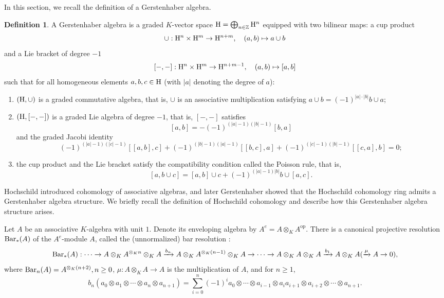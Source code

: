 \documentclass[10pt, reqno]{amsart}
\theoremstyle{definition}
\newtheorem{definition}[theorem]{Definition}
\theoremstyle{remark}
\numberwithin{equation}{section}
\begin{document}
In this section, we recall the definition of a Gerstenhaber algebra. 
\begin{definition}
    A Gerstenhaber algebra   is a graded \(K\)-vector space \(\mathrm{H} = \bigoplus_{n\in\mathbb{Z}} \mathrm{H}^n\) equipped with two bilinear maps: a cup product
\[\cup: \mathrm{H}^n \times \mathrm{H}^m \to \mathrm{H}^{n+m}, \quad (a, b) \mapsto a \cup b\]
and a Lie bracket of degree \(-1\)
\[[-,-]: \mathrm{H}^n \times \mathrm{H}^m \to \mathrm{H}^{n+m-1}, \quad (a, b) \mapsto [a, b]\]
such that for all homogeneous elements \(a, b, c \in \mathrm{H}\) (with \(|a|\) denoting the degree of \(a\)):
\begin{enumerate}
    \item \((\mathrm{H}, \cup)\) is a graded commutative algebra, that is, \(\cup\) is an associative multiplication satisfying \(a \cup b = (-1)^{|a| \cdot |b|} b \cup a\);
    \item \((\mathrm{H}, [-,-])\) is a graded Lie algebra of degree \(-1\), that is, \( [-,-]\) satisfies
\[[a, b] = -(-1)^{(|a|-1)(|b|-1)}[b, a]\]
and the graded Jacobi identity
\[(-1)^{(|a|-1)(|c|-1)}[[a, b], c] + (-1)^{(|b|-1)(|a|-1)}[[b, c], a] + (-1)^{(|c|-1)(|b|-1)}[[c, a], b] = 0;\]
    \item the cup product and the Lie bracket satisfy the compatibility condition called the Poisson rule, that is,
\[[a, b\cup c] = [a, b]\cup  c + (-1)^{(|a|-1)|b|}b\cup [a, c].\]
\end{enumerate}
\end{definition}
Hochschild \cite{Hoc45} introduced cohomology of associative algebras, and later Gerstenhaber \cite{Ger63} showed that the Hochschild cohomology ring admits a Gerstenhaber algebra structure.  We briefly recall the definition of Hochschild cohomology and describe how this Gerstenhaber algebra structure arises.

 Let \( A \) be an associative \(K\)-algebra with unit \( 1 \). Denote its enveloping algebra by \( A^e = A \otimes_K A^{\text{op}} \). There is a canonical projective resolution $\mathrm{Bar}_*(A)$  of the \(A^e\)-module \(A\), called the (unnormalized) bar resolution : 
\[\mathrm{Bar}_*(A): \cdots \to A \otimes_K A^{\otimes_K n} \otimes_K A \xrightarrow{b_n} A \otimes_K A^{\otimes_K (n-1)} \otimes_K A \to \cdots \to A \otimes_K A \otimes_K A \xrightarrow{b_1} A\otimes_K A (\xrightarrow{\mu} A\to 0),\]
where   \(\mathrm{Bar}_n(A)=A^{\otimes_K {(n+2)}},  n\geq 0\), \(\mu: A \otimes_K A \to A\) is the multiplication of \(A\), and for $n\geq 1$, 
\[
b_n(a_0 \otimes a_1 \otimes \cdots \otimes a_n \otimes a_{n+1}) = \sum_{i=0}^n (-1)^i a_0 \otimes \cdots \otimes a_{i-1} \otimes a_i a_{i+1} \otimes a_{i+2} \otimes \cdots \otimes a_{n+1}.
\]
\end{document}
